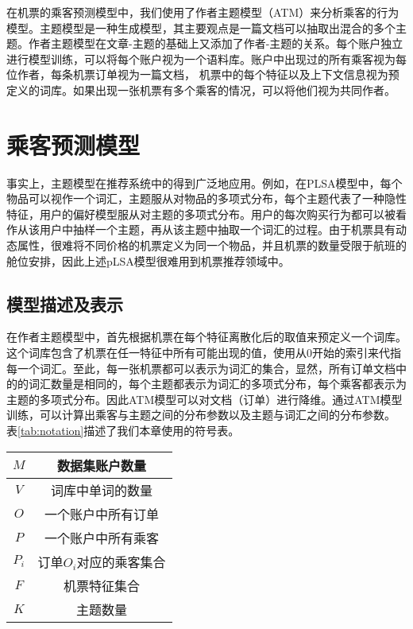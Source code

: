 在机票的乘客预测模型中，我们使用了作者主题模型（ATM）\cite{rosen2004author,steyvers2004probabilistic,rosen2010learning}来分析乘客的行为模型。主题模型是一种生成模型，其主要观点是一篇文档可以抽取出混合的多个主题。作者主题模型在文章-主题的基础上又添加了作者-主题的关系。每个账户独立进行模型训练，可以将每个账户视为一个语料库。账户中出现过的所有乘客视为每位作者，每条机票订单视为一篇文档， 机票中的每个特征以及上下文信息视为预定义的词库。如果出现一张机票有多个乘客的情况，可以将他们视为共同作者。

\section{乘客预测模型}
事实上，主题模型在推荐系统中的得到广泛地应用。例如，在PLSA模型中，每个物品可以视作一个词汇，主题服从对物品的多项式分布，每个主题代表了一种隐性特征，用户的偏好模型服从对主题的多项式分布。用户的每次购买行为都可以被看作从该用户中抽样一个主题，再从该主题中抽取一个词汇的过程。由于机票具有动态属性，很难将不同价格的机票定义为同一个物品，并且机票的数量受限于航班的舱位安排，因此上述pLSA模型很难用到机票推荐领域中。

\subsection{模型描述及表示}

在作者主题模型中，首先根据机票在每个特征离散化后的取值来预定义一个词库。这个词库包含了机票在任一特征中所有可能出现的值，使用从$0$开始的索引来代指每一个词汇。至此，每一张机票都可以表示为词汇的集合，显然，所有订单文档中的的词汇数量是相同的，每个主题都表示为词汇的多项式分布，每个乘客都表示为主题的多项式分布。因此ATM模型可以对文档（订单）进行降维。通过ATM模型训练，可以计算出乘客与主题之间的分布参数以及主题与词汇之间的分布参数。
表\ref{tab:notation}描述了我们本章使用的符号表。

\begin{table}[!hpb]
\centering
\begin{tabular}{|c|c|} \hline
$M$ & 数据集账户数量\\ \hline
$V$ & 词库中单词的数量\\ \hline
$O$ & 一个账户中所有订单\\ \hline
$P$ & 一个账户中所有乘客\\ \hline
$P_i$ & 订单$O_i$对应的乘客集合 \\ \hline
$F$ & 机票特征集合\\ \hline
$K$ & 主题数量\\ \hline
\end{tabular}
\end{table}

